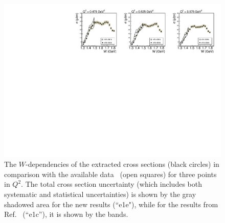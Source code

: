 \documentclass[prc,twocolumn,superscriptaddress,showpacs,amssymb,amsmath,amsfonts,aps,nofootinbib]{revtex4-1}
\begin{document}
\begin{figure}[htp!]
\begin{center}
\includegraphics[width=15cm]{pictures/conclusions/e1e_e1c.pdf}
\caption{\small The $W$-dependencies of the extracted  cross sections (black circles) in comparison with the available data~\cite{Fedotov:2008aa} (open squares) for three points in $Q^{2}$. The total cross section uncertainty (which includes both systematic and statistical uncertainties) is shown by the gray shadowed area for the new results (``e1e"), while for the results from Ref.~\cite{Fedotov:2008aa} (``e1c''), it is shown by the bands.}
\label{fig:e1e_e1c}
\end{center}
\end{figure}
\end{document}
